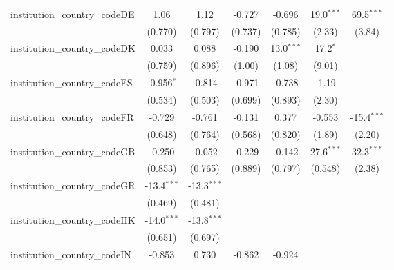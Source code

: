 \begin{tabular}{lcccccc}
   institution\_country\_codeDE          & 1.06          & 1.12          & -0.727        & -0.696        & 19.0$^{***}$  & 69.5$^{***}$\\   
                                         & (0.770)       & (0.797)       & (0.737)       & (0.785)       & (2.33)        & (3.84)\\   
   institution\_country\_codeDK          & 0.033         & 0.088         & -0.190        & 13.0$^{***}$  & 17.2$^{*}$    &   \\   
                                         & (0.759)       & (0.896)       & (1.00)        & (1.08)        & (9.01)        &   \\   
   institution\_country\_codeES          & -0.956$^{*}$  & -0.814        & -0.971        & -0.738        & -1.19         &   \\   
                                         & (0.534)       & (0.503)       & (0.699)       & (0.893)       & (2.30)        &   \\   
   institution\_country\_codeFR          & -0.729        & -0.761        & -0.131        & 0.377         & -0.553        & -15.4$^{***}$\\   
                                         & (0.648)       & (0.764)       & (0.568)       & (0.820)       & (1.89)        & (2.20)\\   
   institution\_country\_codeGB          & -0.250        & -0.052        & -0.229        & -0.142        & 27.6$^{***}$  & 32.3$^{***}$\\   
                                         & (0.853)       & (0.765)       & (0.889)       & (0.797)       & (0.548)       & (2.38)\\   
   institution\_country\_codeGR          & -13.4$^{***}$ & -13.3$^{***}$ &               &               &               &   \\   
                                         & (0.469)       & (0.481)       &               &               &               &   \\   
   institution\_country\_codeHK          & -14.0$^{***}$ & -13.8$^{***}$ &               &               &               &   \\   
                                         & (0.651)       & (0.697)       &               &               &               &   \\   
   institution\_country\_codeIN          & -0.853        & 0.730         & -0.862        & -0.924        &               &   \\   

\end{tabular}
